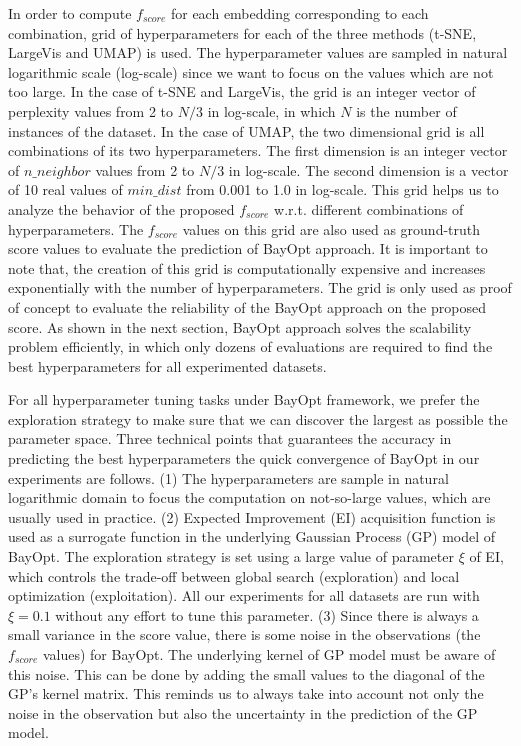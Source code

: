 In order to compute $f_{score}$ for each embedding corresponding to each combination, grid of hyperparameters for each of the three methods (t-SNE, LargeVis and UMAP) is used.
The hyperparameter values are sampled in natural logarithmic scale (log-scale) since we want to focus on the values which are not too large.
In the case of t-SNE and LargeVis, the grid is an integer vector of perplexity values from 2 to $N/3$ in log-scale, in which $N$ is the number of instances of the dataset.
In the case of UMAP, the two dimensional grid is all combinations of its two hyperparameters.
The first dimension is an integer vector of $n\_neighbor$ values from 2 to $N/3$ in log-scale.
The second dimension is a vector of 10 real values of $min\_dist$ from 0.001 to 1.0 in log-scale.
This grid helps us to analyze the behavior of the proposed $f_{score}$ w.r.t. different combinations of hyperparameters.
The $f_{score}$ values on this grid are also used as ground-truth score values to evaluate the prediction of BayOpt approach.
It is important to note that, the creation of this grid is computationally expensive and increases exponentially with the number of hyperparameters.
The grid is only used as proof of concept to evaluate the reliability of the BayOpt approach on the proposed score.
As shown in the next section, BayOpt approach solves the scalability problem efficiently, in which only dozens of evaluations are required to find the best hyperparameters for all experimented datasets.

For all hyperparameter tuning tasks under BayOpt framework, we prefer the exploration strategy to make sure that we can discover the largest as possible the parameter space.
Three technical points that guarantees the accuracy in predicting the best hyperparameters the quick convergence of BayOpt in our experiments are follows.
(1) The hyperparameters are sample in natural logarithmic domain to focus the computation on not-so-large values, which are usually used in practice.
(2) Expected Improvement (EI) acquisition function is used as a surrogate function in the underlying Gaussian Process (GP) model of BayOpt.
The exploration strategy is set using a large value of parameter $\xi$ of EI, which controls the trade-off between global search (exploration) and local optimization (exploitation).
All our experiments for all datasets are run with $\xi=0.1$ without any effort to tune this parameter.
(3) Since there is always a small variance in the score value, there is some noise in the observations (the $f_{score}$ values) for BayOpt.
The underlying kernel of GP model must be aware of this noise.
This can be done by adding the small values to the diagonal of the GP's kernel matrix.
This reminds us to always take into account not only the noise in the observation but also the uncertainty in the prediction of the GP model.

